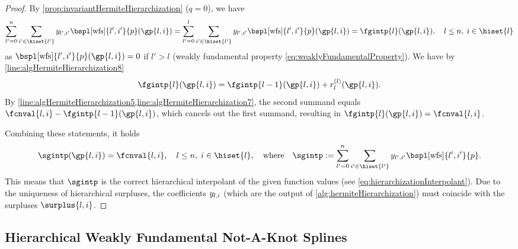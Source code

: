 \begin{proof}
  By \cref{prop:invariantHermiteHierarchization} ($q = 0$), we have
  \begin{equation}
    \sum_{l'=0}^n \sum_{i' \in \hiset{l'}}
    \linout{l',i'} \bspl[\wfs]{l',i'}{p}(\gp{l,i})
    = \sum_{l'=0}^l \sum_{i' \in \hiset{l'}}
    \linout{l',i'} \bspl[\wfs]{l',i'}{p}(\gp{l,i})
    = \fgintp{l}(\gp{l,i}),\quad
    l \le n,\; i \in \hiset{l}
  \end{equation}
  as $\bspl[\wfs]{l',i'}{p}(\gp{l,i}) = 0$ if $l' > l$
  (weakly fundamental property \eqref{eq:weaklyFundamentalProperty}).
  We have by \cref{line:algHermiteHierarchization8}
  \begin{equation}
    \fgintp{l}(\gp{l,i})
    = \fgintp{l-1}(\gp{l,i}) + r^{(l)}_l(\gp{l,i}).
  \end{equation}
  By \cref{line:algHermiteHierarchization5,line:algHermiteHierarchization7},
  the second summand equals $\fcnval{l,i} - \fgintp{l-1}(\gp{l,i})$,
  which cancels out the first summand, resulting in
  $\fgintp{l}(\gp{l,i}) = \fcnval{l,i}$.
  
  Combining these statements, it holds
  \begin{equation}
    \sgintp(\gp{l,i})
    = \fcnval{l,i},\quad
    l \le n,\; i \in \hiset{l},
    \quad\text{where}\quad
    \sgintp
    := \sum_{l'=0}^n \sum_{i' \in \hiset{l'}}
    \linout{l',i'} \bspl[\wfs]{l',i'}{p}.
  \end{equation}
  This means that $\sgintp$ is the correct hierarchical interpolant
  of the given function values
  (see \cref{eq:hierarchizationInterpolant}).
  Due to the uniqueness of hierarchical surpluses,
  the coefficients $\linout{l,i}$
  (which are the output of \cref{alg:hermiteHierarchization})
  must coincide with the surpluses $\surplus{l,i}$.
\end{proof}



\subsection{Hierarchical Weakly Fundamental Not-A-Knot Splines}
\label{sec:456wfsNotAKnot}

\blindtext{}
